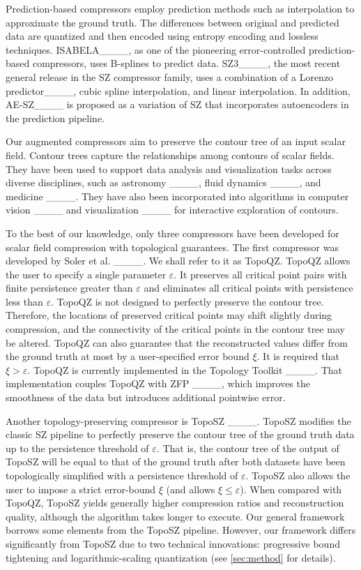 Prediction-based compressors employ prediction methods such as interpolation to approximate the ground truth. The differences between original and predicted data are quantized and then encoded using entropy encoding and lossless techniques. 
ISABELA____, as one of the pioneering error-controlled prediction-based compressors, uses B-splines to predict data. 
SZ3____, the most recent general release in the SZ compressor family, uses a combination of a Lorenzo predictor____, cubic spline interpolation, and linear interpolation. 
In addition, AE-SZ____ is proposed as a variation of SZ that incorporates autoencoders in the prediction pipeline.

 Our augmented compressors aim to preserve the contour tree of an input scalar field. 
Contour trees capture the relationships among contours of scalar fields. 
They have been used to support data analysis and visualization tasks across diverse disciplines, such as astronomy ____, fluid dynamics ____, and medicine ____. 
They have also been incorporated into algorithms in computer vision ____ and visualization ____ for interactive exploration of contours.  

To the best of our knowledge, only three compressors have been developed for scalar field compression with topological guarantees. 
The first compressor was developed by Soler et al. ____. We shall refer to it as TopoQZ. 
TopoQZ allows the user to specify a single parameter $\varepsilon$. 
It preserves all critical point pairs with finite persistence greater than $\varepsilon$ and eliminates all critical points with persistence less than $\varepsilon$. 
TopoQZ is not designed to perfectly preserve the contour tree. Therefore, the locations of preserved critical points may shift slightly during compression, and the connectivity of the critical points in the contour tree may be altered. 
TopoQZ can also guarantee that the reconstructed values differ from the ground truth at most by a user-specified error bound $\xi$. It is required that $\xi > \varepsilon$.
TopoQZ is currently implemented in the Topology Toolkit ____. That implementation couples TopoQZ with ZFP ____, which improves the smoothness of the data but introduces additional pointwise error.

Another topology-preserving compressor is TopoSZ ____. 
TopoSZ modifies the classic SZ pipeline to perfectly preserve the contour tree of the ground truth data up to the persistence threshold of $\varepsilon$. 
That is, the contour tree of the output of TopoSZ will be equal to that of the ground truth after both datasets have been topologically simplified with a persistence threshold of $\varepsilon$. 
TopoSZ also allows the user to impose a strict error-bound $\xi$ (and allows $\xi \leq \varepsilon$). When compared with TopoQZ, TopoSZ yields generally higher compression ratios and reconstruction quality, although the algorithm takes longer to execute. 
Our general framework borrows some elements from the TopoSZ pipeline. However, our framework differs significantly from TopoSZ due to two technical innovations: progressive bound tightening and logarithmic-scaling quantization (see \cref{sec:method} for details).  

